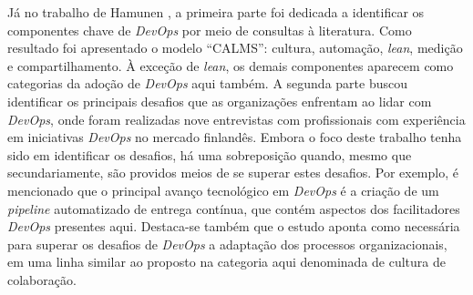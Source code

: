 Já no trabalho de Hamunen \cite{challenges_in_adopting_devops}, a primeira parte
foi dedicada a identificar os componentes chave de {\it DevOps} por meio de
consultas à literatura. Como resultado foi apresentado o modelo ``CALMS'':
cultura, automação, {\it lean}, medição e compartilhamento. À exceção de {\it lean},
os demais componentes aparecem como categorias da adoção de {\it DevOps} aqui
também. A segunda parte buscou identificar os principais desafios que as
organizações enfrentam ao lidar com {\it DevOps}, onde foram realizadas nove
entrevistas com profissionais com experiência em iniciativas {\it DevOps} no
mercado finlandês. Embora o foco deste trabalho tenha sido em identificar os
desafios, há uma sobreposição quando, mesmo que secundariamente, são providos
meios de se superar estes desafios. Por exemplo, é mencionado que o principal
avanço tecnológico em {\it DevOps} é a criação de um {\it pipeline} automatizado
de entrega contínua, que contém aspectos dos facilitadores {\it DevOps} presentes
aqui. Destaca-se também que o estudo aponta como necessária para superar os
desafios de {\it DevOps} a adaptação dos processos organizacionais, em uma
linha similar ao proposto na categoria aqui denominada de cultura de colaboração.

